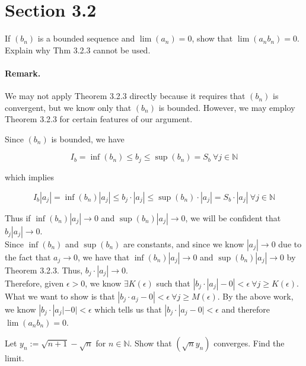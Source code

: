 \documentclass[paper=a4, fontsize=11pt]{scrartcl} %
\numberwithin{equation}{section} %
\numberwithin{figure}{section} %
\numberwithin{table}{section} %
\begin{document}
\section*{Section 3.2}
 If $(b_n)$ is a bounded sequence and $\lim(a_n) = 0$, show that $\lim(a_n b_n) = 0$. Explain why Thm 3.2.3 cannot be used.

\paragraph{Remark.} We may not apply Theorem 3.2.3 directly because it requires that $(b_n)$ is convergent, but we know only that $(b_n)$ is bounded. However, we may employ Theorem 3.2.3 for certain features of our argument.

\pf Since $(b_n)$ is bounded, we have

\begin{equation*}
I_b = \inf(b_n) \leq b_j \leq \sup(b_n) = S_b ~ \forall j \in \mathbb{N}
\end{equation*}

which implies

\begin{equation*}
I_b |a_j|  = \inf(b_n) |a_j| \leq b_j \cdot |a_j| \leq \sup(b_n) \cdot |a_j| = S_b \cdot |a_j| ~ \forall j \in \mathbb{N}
\end{equation*}

Thus if $\inf(b_n)|a_j| \rightarrow 0$ and $\sup(b_n) |a_j| \rightarrow 0$, we will be confident that $b_j |a_j| \rightarrow 0$.\\

Since $\inf(b_n)$ and $\sup(b_n)$ are constants, and since we know $|a_j| \rightarrow 0$ due to the fact that $a_j \rightarrow 0$, we have that $\inf(b_n) |a_j| \rightarrow 0$ and $\sup(b_n) |a_j| \rightarrow 0$ by Theorem 3.2.3. Thus, $b_j \cdot |a_j| \rightarrow 0$.\\

Therefore, given $\epsilon > 0$, we know $\exists K(\epsilon)$ such that $\left| b_j \cdot |a_j| - 0 \right| < \epsilon ~ \forall j \geq K(\epsilon)$.\\

What we want to show is that $|b_j \cdot a_j - 0| < \epsilon ~ \forall j \geq M(\epsilon)$. By the above work, we know $|b_j \cdot |a_j| - 0| < \epsilon$ which tells us that $|b_j \cdot |a_j - 0| < \epsilon$ and therefore $\lim(a_n b_n) = 0$. \done

 Let $y_n := \sqrt{n+1} - \sqrt{n}$ for $n \in \mathbb{N}$. Show that $(\sqrt{n} y_n)$ converges. Find the limit.
\end{document}
